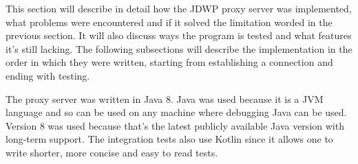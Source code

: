 \documentclass[..thesis.tex]{subfiles}
\begin{document}
This section will describe in detail how the JDWP proxy server was implemented, what problems were encountered and if it solved the limitation worded in the previous section.
It will also discuss ways the program is tested and what features it's still lacking.
The following subsections will describe the implementation in the order in which they were written, starting from establishing a connection and ending with testing.

The proxy server was written in Java 8.
Java was used because it is a JVM language and so can be used on any machine where debugging Java can be used.
Version 8 was used because that's the latest publicly available Java version with long-term support.
The integration tests also use Kotlin since it allows one to write shorter, more concise and easy to read tests.
\end{document}
